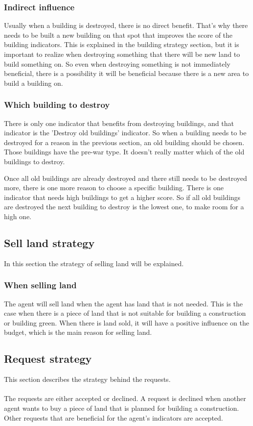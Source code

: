 \subsubsection{Indirect influence}
Usually when a building is destroyed, there is no direct benefit. That's why there needs to be built a new building on that spot that improves the score of the building indicators. This is explained in the building strategy section, but it is important to realize when destroying something that there will be new land to build something on. So even when destroying something is not immediately beneficial, there is a possibility it will be beneficial because there is a new area to build a building on.

\subsubsection{Which building to destroy}
There is only one indicator that benefits from destroying buildings, and that indicator is the 'Destroy old buildings' indicator. So when a building needs to be destroyed for a reason in the previous section, an old building should be chosen. Those buildings have the pre-war type. It doesn't really matter which of the old buildings to destroy. 

Once all old buildings are already destroyed and there still needs to be destroyed more, there is one more reason to choose a specific building. There is one indicator that needs high buildings to get a higher score. So if all old buildings are destroyed the next building to destroy is the lowest one, to make room for a high one.

\subsection{Sell land strategy}
In this section the strategy of selling land will be explained. 

\subsubsection{When selling land}
The agent will sell land when the agent has land that is not needed. This is the case when there is a piece of land that is not suitable for building a construction or building green. When there is land sold, it will have a positive influence on the budget, which is the main reason for selling land.

\subsection{Request strategy}
This section describes the strategy behind the requests.
\\\\
The requests are either accepted or declined. A request is declined when another agent wants to buy a piece of land that is planned for building a construction. Other requests that are beneficial for the agent’s indicators are accepted.

